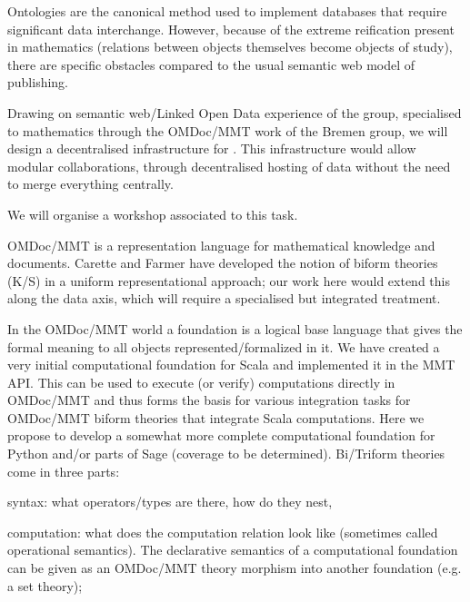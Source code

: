 \begin{workpackage}[id=dksbases,wphases=1-48!.5,
  title=Data/Knowledge/Software-Bases,lead=JU,
  ZHRM=12,JURM=36,USHRM=12,UWRM=25,SARM=10,LLRM=2,PSRM=4]
\begin{tasklist}
\begin{task}[id=data-design,lead=JU,partners={ZH,US,SA,UW,LL},
  title={Formulation of requirements and design of new  infrastructure when appropriate}]
  Ontologies are the canonical method used to implement databases that require significant
  data interchange. However, because of the extreme reification present in mathematics
  (relations between objects themselves become objects of study), there are specific
  obstacles compared to the usual semantic web model of publishing.

  Drawing on semantic web/Linked Open Data experience of the  group, specialised to
  mathematics through the OMDoc/MMT work of the Bremen group, we will design a
  decentralised infrastructure for \TheProject. This infrastructure would allow modular
  collaborations, through decentralised hosting of data without the need to merge
  everything centrally.

 We will organise a workshop associated to this task.
\end{task}

\begin{task}[title=Triform Theories in OMDoc/MMT,id=data-triform,
  lead=JU,partners={ZH}]
OMDoc/MMT is a representation language for mathematical knowledge and documents. Carette and Farmer have developed the notion of biform theories (K/S) in a uniform representational approach; our work here would extend this along the data axis, which will require a specialised but integrated treatment.
\end{task}

\begin{task}[title=Computational Foundation for Python/Sage (or some CAS),
  id=data-foundationCAS,lead=JU,partners={ZH,SA}]
In the OMDoc/MMT world a foundation is a logical base language that gives the formal meaning to all objects represented/formalized in it. We have created a very initial computational foundation for Scala and implemented it in the MMT API. This can be used to execute (or verify) computations directly in OMDoc/MMT and thus forms the basis for various integration tasks for OMDoc/MMT biform theories that integrate Scala computations. Here we propose to develop a somewhat more complete computational foundation for Python and/or parts of Sage (coverage to be determined). Bi/Triform theories come in three parts:
\begin{compactitem}
\item syntax: what operators/types are there, how do they nest, 
\item computation:  what does the computation relation look like (sometimes called operational semantics). The declarative semantics of a computational foundation can be given as an OMDoc/MMT theory morphism into another foundation (e.g. a set theory);
\item {}
\end{compactitem}
\end{task}


\end{tasklist}
\end{workpackage}
